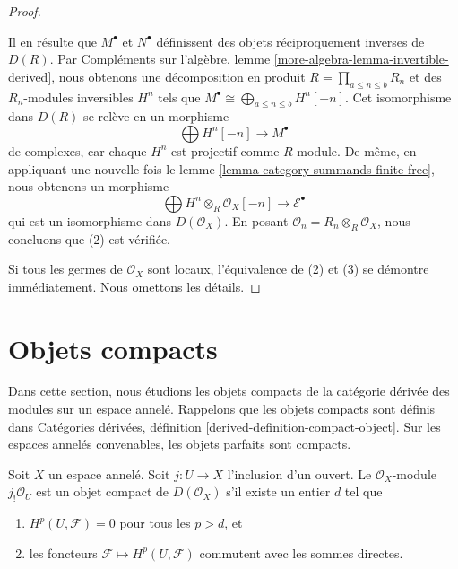 {\begin{proof}
\begin{enumerate}
\end{enumerate}

Il en résulte que $M^\bullet$ et $N^\bullet$ définissent des objets réciproquement inverses de $D(R)$. Par Compléments sur l'algèbre, lemme \ref{more-algebra-lemma-invertible-derived},
nous obtenons une décomposition en produit $R = \prod_{a \leq n \leq b} R_n$
et des $R_n$-modules inversibles $H^n$ tels que $M^\bullet \cong \bigoplus_{a \leq n \leq b} H^n[-n]$. Cet isomorphisme dans $D(R)$ se relève en un morphisme
$$
\bigoplus H^n[-n] \longrightarrow M^\bullet
$$
de complexes, car chaque $H^n$ est projectif comme $R$-module. De même, en appliquant une nouvelle fois le lemme \ref{lemma-category-summands-finite-free}, nous obtenons un morphisme
$$
\bigoplus H^n \otimes_R \mathcal{O}_X[-n] \to \mathcal{E}^\bullet
$$
qui est un isomorphisme dans $D(\mathcal{O}_X)$. En posant
$\mathcal{O}_n = R_n \otimes_R \mathcal{O}_X$, nous concluons que (2) est vérifiée.

\medskip\noindent

Si tous les germes de $\mathcal{O}_X$ sont locaux, l'équivalence de (2) et (3) se démontre immédiatement. Nous omettons les détails.

\end{proof}





\section{Objets compacts}

\label{section-compact}

\noindent
Dans cette section, nous étudions les objets compacts de la catégorie dérivée des modules sur un espace annelé. Rappelons que les objets compacts sont définis dans Catégories dérivées, définition \ref{derived-definition-compact-object}. Sur les espaces annelés convenables, les objets parfaits sont compacts.

\begin{lemma}

\label{lemma-when-jshriek-compact}
Soit $X$ un espace annelé. Soit $j : U \to X$ l'inclusion d'un ouvert. Le $\mathcal{O}_X$-module $j_!\mathcal{O}_U$ est un objet compact de $D(\mathcal{O}_X)$ s'il existe un entier $d$ tel que
\begin{enumerate}
\item $H^p(U, \mathcal{F}) = 0$ pour tous les $p > d$, et
\item les foncteurs $\mathcal{F} \mapsto H^p(U, \mathcal{F})$
commutent avec les sommes directes.
\end{enumerate}


\end{lemma}}
